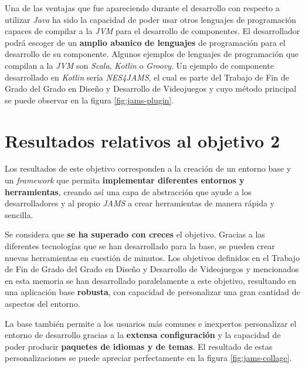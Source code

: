 Una de las ventajas que fue apareciendo durante el
desarrollo con respecto a utilizar \textit{Java} ha sido la
capacidad de poder usar otros lenguajes de programación capaces
de compilar a la \textit{JVM} para el desarrollo de componentes.
El desarrollador podrá escoger de  un \textbf{amplio abanico de lenguajes}
de programación para el desarrollo de su componente.
Algunos ejemplos de lenguajes de programación que compilan a la \textit{JVM}
son \textit{Scala}, \textit{Kotlin} o \textit{Groovy}.
Un ejemplo de componente desarrollado en \textit{Kotlin} sería
\textit{NES4JAMS}, el cual es parte del Trabajo de Fin de Grado del Grado en
Diseño y Desarrollo de Videojuegos y cuyo método principal se puede observar
en la figura \ref{fig:jams-plugin}.


\section{Resultados relativos al objetivo 2}\label{sec:resultados-relativos-al-objetivo-2}

Los resultados de este objetivo corresponden a la creación de
un entorno base y un \textit{framework} que permita \textbf{implementar
diferentes entornos y herramientas}, creando así una capa
de abstracción que ayude a los desarrolladores y al propio
\textit{JAMS} a crear herramientas de manera rápida y sencilla.

Se considera que \textbf{se ha superado con creces}
el objetivo.
Gracias a las diferentes tecnologías que se han desarrollado
para la base, se pueden crear nuevas herramientas en cuestión
de minutos.
Los objetivos definidos en el Trabajo de Fin de Grado del Grado en
Diseño y Desarrollo de Videojuegos y mencionados en esta memoria
se han desarrollado paralelamente a este objetivo, resultando
en una aplicación base \textbf{robusta}, con capacidad de personalizar
una gran cantidad de aspectos del entorno.

La base también permite a los usuarios más comunes e
inexpertos personalizar el entorno de desarrollo gracias a la
\textbf{extensa configuración} y la capacidad de poder producir
\textbf{paquetes de idiomas y de temas}.
El resultado de estas personalizaciones se puede apreciar
perfectamente en la figura \ref{fig:jams-collage}.

